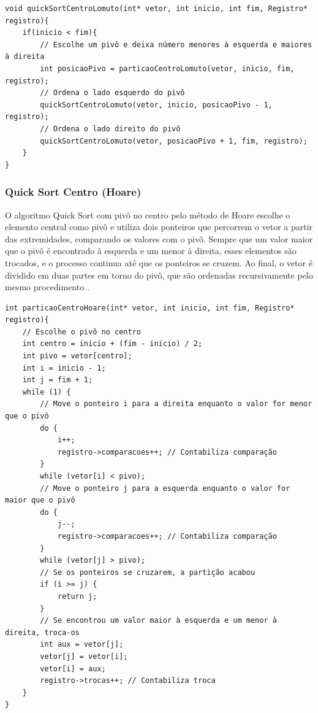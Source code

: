 \documentclass[12pt]{article}
\begin{document}
\newpage

\begin{lstlisting}
void quickSortCentroLomuto(int* vetor, int inicio, int fim, Registro* registro){
    if(inicio < fim){
        // Escolhe um pivô e deixa número menores à esquerda e maiores à direita
        int posicaoPivo = particaoCentroLomuto(vetor, inicio, fim, registro); 
        // Ordena o lado esquerdo do pivô
        quickSortCentroLomuto(vetor, inicio, posicaoPivo - 1, registro); 
        // Ordena o lado direito do pivô
        quickSortCentroLomuto(vetor, posicaoPivo + 1, fim, registro); 
    }
}
\end{lstlisting}

\subsubsection{Quick Sort Centro (Hoare)}

O algoritmo Quick Sort com pivô no centro pelo método de Hoare escolhe o elemento central como pivô e utiliza dois ponteiros que percorrem o vetor a partir das extremidades, comparando os valores com o pivô. Sempre que um valor maior que o pivô é encontrado à esquerda e um menor à direita, esses elementos são trocados, e o processo continua até que os ponteiros se cruzem. Ao final, o vetor é dividido em duas partes em torno do pivô, que são ordenadas recursivamente pelo mesmo procedimento \cite{cormen2009}.

\begin{lstlisting}
int particaoCentroHoare(int* vetor, int inicio, int fim, Registro* registro){
    // Escolhe o pivô no centro
    int centro = inicio + (fim - inicio) / 2;
    int pivo = vetor[centro];
    int i = inicio - 1;
    int j = fim + 1;
    while (1) {
        // Move o ponteiro i para a direita enquanto o valor for menor que o pivô
        do {
            i++;
            registro->comparacoes++; // Contabiliza comparação
        } 
        while (vetor[i] < pivo);
        // Move o ponteiro j para a esquerda enquanto o valor for maior que o pivô
        do {
            j--;
            registro->comparacoes++; // Contabiliza comparação
        } 
        while (vetor[j] > pivo);
        // Se os ponteiros se cruzarem, a partição acabou
        if (i >= j) {
            return j;
        }
        // Se encontrou um valor maior à esquerda e um menor à direita, troca-os
        int aux = vetor[j];
        vetor[j] = vetor[i];
        vetor[i] = aux;
        registro->trocas++; // Contabiliza troca
    }
}
\end{lstlisting}
\end{document}
